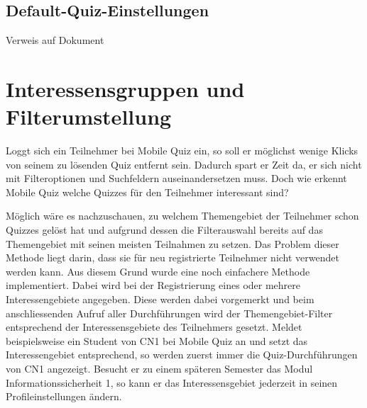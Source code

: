 






\subsection{Default-Quiz-Einstellungen}
Verweis auf Dokument



\section{Interessensgruppen und Filterumstellung}
Loggt sich ein Teilnehmer bei Mobile Quiz ein, so soll er möglichst wenige Klicks von seinem zu lösenden Quiz entfernt sein. Dadurch spart er Zeit da, er sich nicht mit Filteroptionen und Suchfeldern auseinandersetzen muss. Doch wie erkennt Mobile Quiz welche Quizzes für den Teilnehmer interessant sind?

Möglich wäre es nachzuschauen, zu welchem Themengebiet der Teilnehmer schon Quizzes gelöst hat und aufgrund dessen die Filterauswahl bereits auf das Themengebiet mit seinen meisten Teilnahmen zu setzen. Das Problem dieser Methode liegt darin, dass sie für neu registrierte Teilnehmer nicht verwendet werden kann.
Aus diesem Grund wurde eine noch einfachere Methode implementiert. Dabei wird bei der Registrierung eines oder mehrere Interessengebiete angegeben. Diese werden dabei vorgemerkt und beim anschliessenden Aufruf aller Durchführungen wird der Themengebiet-Filter entsprechend der Interessensgebiete des Teilnehmers gesetzt. Meldet beispielsweise ein Student von CN1 bei Mobile Quiz an und setzt das Interessengebiet entsprechend, so werden zuerst immer die Quiz-Durchführungen von CN1 angezeigt. Besucht er zu einem späteren Semester das Modul Informationssicherheit 1, so kann er das Interessensgebiet jederzeit in seinen Profileinstellungen ändern.

